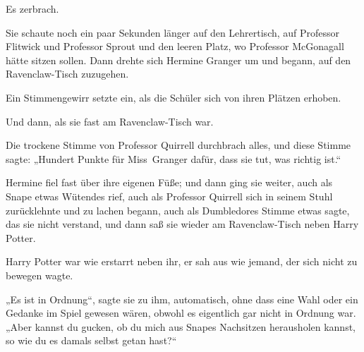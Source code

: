 Es zerbrach.

Sie schaute noch ein paar Sekunden länger auf den Lehrertisch, auf Professor Flitwick und Professor Sprout und den leeren Platz, wo Professor McGonagall hätte sitzen sollen. Dann drehte sich Hermine Granger um und begann, auf den Ravenclaw-Tisch zuzugehen.

Ein Stimmengewirr setzte ein, als die Schüler sich von ihren Plätzen erhoben.

Und dann, als sie fast am Ravenclaw-Tisch war.

Die trockene Stimme von Professor Quirrell durchbrach alles, und diese Stimme sagte:
„Hundert Punkte für Miss~Granger dafür, dass sie tut, was richtig ist.“

Hermine fiel fast über ihre eigenen Füße; und dann ging sie weiter, auch als Snape etwas Wütendes rief, auch als Professor Quirrell sich in seinem Stuhl zurücklehnte und zu lachen begann, auch als Dumbledores Stimme etwas sagte, das sie nicht verstand, und dann saß sie wieder am Ravenclaw-Tisch neben Harry Potter.

Harry Potter war wie erstarrt neben ihr, er sah aus wie jemand, der sich nicht zu bewegen wagte.

„Es ist in Ordnung“, sagte sie zu ihm, automatisch, ohne dass eine Wahl oder ein Gedanke im Spiel gewesen wären, obwohl es eigentlich gar nicht in Ordnung war.
„Aber kannst du gucken, ob du mich aus Snapes Nachsitzen herausholen kannst, so wie du es damals selbst getan hast?“

